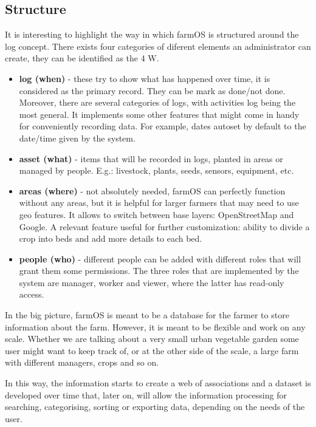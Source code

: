 \subsection{Structure}
It is interesting to highlight the way in which farmOS is structured around the log concept. There exists four categories of diferent elements an administrator can create, they can be identified as the 4 W.
\begin{itemize}
	\item \textbf{log (when)} - these try to show what has happened over time, it is considered as the primary record. They can be mark as done/not done. Moreover, there are several categories of logs, with activities log being the most general. It implements some other features that might come in handy for conveniently recording data. For example, dates autoset by default to the date/time given by the system.
	\item \textbf{asset (what)} - items that will be recorded in logs, planted in areas or managed by people. E.g.: livestock, plants, seeds, sensors, equipment, etc.
	\item \textbf{areas (where)} - not absolutely needed, farmOS can perfectly function without any areas, but it is helpful for larger farmers that may need to use geo features. It allows to switch between base layers: OpenStreetMap and Google. A relevant feature useful for further customization: ability to divide a crop into beds and add more details to each bed.
	\item \textbf{people (who)} - different people can be added with different roles that will grant them some permissions. The three roles that are implemented by the system are manager, worker and viewer, where the latter has read-only access.
\end{itemize}


In the big picture, farmOS is meant to be a database for the farmer to store information about the farm. However, it is meant to be flexible and work on any scale. Whether we are talking about a very small urban vegetable garden some user might want to keep track of, or at the other side of the scale, a large farm with different managers, crops and so on.

In this way, the information starts to create a web of associations and a dataset is developed over time that, later on, will allow the information processing for searching, categorising, sorting or exporting data, depending on the needs of the user. 


